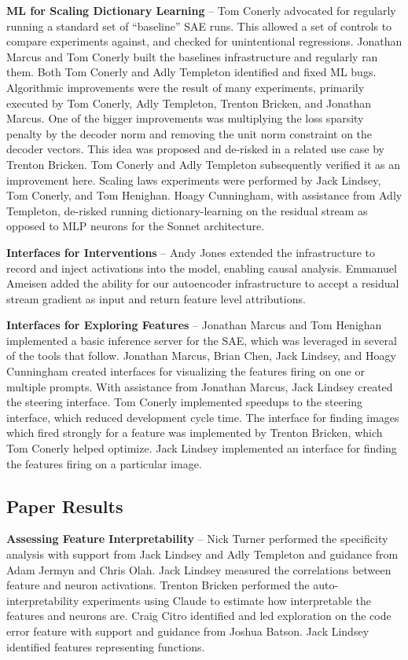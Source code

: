 \documentclass{article}
\let\oldsubsection\subsection
\renewcommand{\subsection}{\FloatBarrier\oldsubsection}
\begin{document}
\textbf{ML for Scaling Dictionary Learning} -- Tom Conerly advocated for regularly running a standard set of “baseline” SAE runs. This allowed a set of controls to compare experiments against, and checked for unintentional regressions. Jonathan Marcus and Tom Conerly built the baselines infrastructure and regularly ran them. Both Tom Conerly and Adly Templeton identified and fixed ML bugs. Algorithmic improvements were the result of many experiments, primarily executed by Tom Conerly, Adly Templeton, Trenton Bricken, and Jonathan Marcus. One of the bigger improvements was multiplying the loss sparsity penalty by the decoder norm and removing the unit norm constraint on the decoder vectors. This idea was proposed and de-risked in a related use case by Trenton Bricken. Tom Conerly and Adly Templeton subsequently verified it as an improvement here. Scaling laws experiments were performed by Jack Lindsey, Tom Conerly, and Tom Henighan. Hoagy Cunningham, with assistance from Adly Templeton, de-risked running dictionary-learning on the residual stream as opposed to MLP neurons for the Sonnet architecture.

\textbf{Interfaces for Interventions } -- Andy Jones extended the infrastructure to record and inject activations into the model, enabling causal analysis. Emmanuel Ameisen added the ability for our autoencoder infrastructure to accept a residual stream gradient as input and return feature level attributions.

\textbf{Interfaces for Exploring Features} -- Jonathan Marcus and Tom Henighan implemented a basic inference server for the SAE, which was leveraged in several of the tools that follow. Jonathan Marcus, Brian Chen, Jack Lindsey, and Hoagy Cunningham created interfaces for visualizing the features firing on one or multiple prompts. With assistance from Jonathan Marcus, Jack Lindsey created the steering interface. Tom Conerly implemented speedups to the steering interface, which reduced development cycle time. The interface for finding images which fired strongly for a feature was implemented by Trenton Bricken, which Tom Conerly helped optimize. Jack Lindsey implemented an interface for finding the features firing on a particular image.

\subsection{Paper Results}

\textbf{Assessing Feature Interpretability} -- Nick Turner performed the specificity analysis with support from Jack Lindsey and Adly Templeton and guidance from Adam Jermyn and Chris Olah. Jack Lindsey measured the correlations between feature and neuron activations. Trenton Bricken performed the auto-interpretability experiments using Claude to estimate how interpretable the features and neurons are. Craig Citro identified and led exploration on the code error feature with support and guidance from Joshua Batson. Jack Lindsey identified features representing functions.
\end{document}
